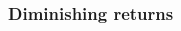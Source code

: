 \documentclass[xcolor=pdftex,dvipsnames]{beamer}
\begin{document}
\begin{frame}
  \frametitle{Diminishing returns}
  \begin{columns}
    \begin{column}{6.5cm}
      \begin{center}
      \end{center}
    \end{column}
    \begin{column}{6.5cm}
      \begin{center}
      \end{center}
    \end{column}
    \begin{column}{6cm}
    \end{column}
  \end{columns}
\end{frame}
\end{document}
